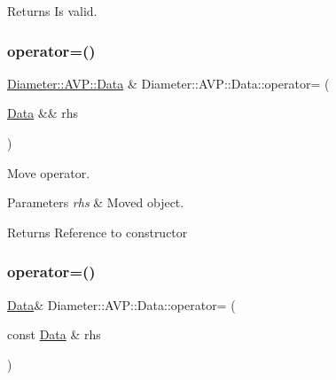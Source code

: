 \begin{DoxyReturn}{Returns}
Is valid. 
\end{DoxyReturn}
\mbox{\label{classDiameter_1_1AVP_1_1Data_ae22c091934eb984ae9f0a03117ac7bf5}} 
\subsubsection{\texorpdfstring{operator=()}{operator=()}\hspace{0.1cm}{\footnotesize\ttfamily [1/2]}}
{\footnotesize\ttfamily \hyperlink{classDiameter_1_1AVP_1_1Data}{Diameter\+::\+A\+V\+P\+::\+Data} \& Diameter\+::\+A\+V\+P\+::\+Data\+::operator= (\begin{DoxyParamCaption}\item[{\hyperlink{classDiameter_1_1AVP_1_1Data}{Data} \&\&}]{rhs }\end{DoxyParamCaption})\hspace{0.3cm}{\ttfamily [noexcept]}}



Move operator. 


\begin{DoxyParams}{Parameters}
{\em rhs} & Moved object. \\
\hline
\end{DoxyParams}
\begin{DoxyReturn}{Returns}
Reference to constructor 
\end{DoxyReturn}
\mbox{\label{classDiameter_1_1AVP_1_1Data_aae8acff35ff879145a549d25320df2ea}} 
\subsubsection{\texorpdfstring{operator=()}{operator=()}\hspace{0.1cm}{\footnotesize\ttfamily [2/2]}}
{\footnotesize\ttfamily \hyperlink{classDiameter_1_1AVP_1_1Data}{Data}\& Diameter\+::\+A\+V\+P\+::\+Data\+::operator= (\begin{DoxyParamCaption}\item[{const \hyperlink{classDiameter_1_1AVP_1_1Data}{Data} \&}]{rhs }\end{DoxyParamCaption})\hspace{0.3cm}{\ttfamily [default]}}



